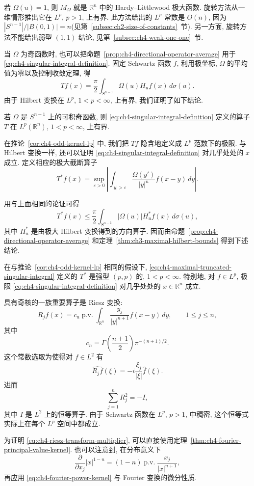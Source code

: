 若 $\Omega(u)=1$, 则 $M_\Omega$ 就是 $\mathbb R^n$ 中的 Hardy--Littlewood 极大函数. 旋转方法从一维情形推出它在 $L^p$, $p>1$, 上有界. 此方法给出的 $L^p$ 常数是 $O(n)$, 因为 $|S^{n-1}|/|B(0,1)|=n$(见第~\ref{subsec:ch2-size-of-constants}~节). 另一方面, 旋转方法不能给出弱型 $(1,1)$ 结论, 见第~\ref{subsec:ch4-weak-one-one}~节.

当 $\Omega$ 为奇函数时, 也可以把命题~\ref{prop:ch4-directional-operator-average} 用于 \eqref{eq:ch4-singular-integral-definition}. 固定 Schwartz 函数 $f$, 利用极坐标, $\Omega$ 的平均值为零以及控制收敛定理, 得
\[
 Tf(x)=\frac\pi2\int_{S^{n-1}}\Omega(u)H_uf(x)\,d\sigma(u).
\]
由于 Hilbert 变换在 $L^p$, $1<p<\infty$, 上有界, 我们证明了如下结论.

\begin{Corollary}
\label{cor:ch4-odd-kernel-lp}
若 $\Omega$ 是 $S^{n-1}$ 上的可积奇函数, 则 \eqref{eq:ch4-singular-integral-definition} 定义的算子 $T$ 在 $L^p(\mathbb R^n)$, $1<p<\infty$, 上有界.
\end{Corollary}

在推论~\ref{cor:ch4-odd-kernel-lp} 中, 我们把 $Tf$ 隐含地定义成 $L^p$ 范数下的极限. 与 Hilbert 变换一样, 还可以证明 \eqref{eq:ch4-singular-integral-definition} 对几乎处处的 $x$ 成立. 定义相应的极大截断算子
\begin{equation}
\label{eq:ch4-maximal-truncated-singular-integral}
 T^*f(x)=\sup_{\varepsilon>0}\left|
 \int_{|y|>\varepsilon}\frac{\Omega(y')}{|y|^n}f(x-y)\,dy\right|.
\end{equation}

\hypertarget{chapter-04-page-088}{}
用与上面相同的论证可得
\[
 T^*f(x)\le\frac\pi2\int_{S^{n-1}}|\Omega(u)|H_u^*f(x)\,d\sigma(u),
\]
其中 $H_u^*$ 是由极大 Hilbert 变换得到的方向算子. 因而由命题~\ref{prop:ch4-directional-operator-average} 和定理~\ref{thm:ch3-maximal-hilbert-bounds} 得到下述结论.

\begin{Corollary}
\label{cor:ch4-maximal-truncation-lp}
在与推论~\ref{cor:ch4-odd-kernel-lp} 相同的假设下, \eqref{eq:ch4-maximal-truncated-singular-integral} 定义的 $T^*$ 是强型 $(p,p)$ 的, $1<p<\infty$. 特别地, 对 $f\in L^p$, 极限 \eqref{eq:ch4-singular-integral-definition} 对几乎处处的 $x\in\mathbb R^n$ 成立.
\end{Corollary}

具有奇核的一族重要算子是 Riesz 变换:
\begin{equation}
\label{eq:ch4-riesz-transform-definition}
 R_jf(x)=c_n\operatorname{p.v.}\int_{\mathbb R^n}
 \frac{y_j}{|y|^{n+1}}f(x-y)\,dy,
 \qquad 1\le j\le n,
\end{equation}
其中
\[
 c_n=\Gamma\left(\frac{n+1}{2}\right)\pi^{-(n+1)/2}.
\]
这个常数选取为使得对 $f\in L^2$ 有
\begin{equation}
\label{eq:ch4-riesz-transform-multiplier}
 \widehat{R_jf}(\xi)=-i\frac{\xi_j}{|\xi|}\widehat f(\xi).
\end{equation}
进而
\begin{equation}
\label{eq:ch4-riesz-square-identity}
 \sum_{j=1}^nR_j^2=-I,
\end{equation}
其中 $I$ 是 $L^2$ 上的恒等算子. 由于 Schwartz 函数在 $L^p$, $p>1$, 中稠密, 这个恒等式实际上在每个 $L^p$ 空间中都成立.

为证明 \eqref{eq:ch4-riesz-transform-multiplier}, 可以直接使用定理~\ref{thm:ch4-fourier-principal-value-kernel}. 也可以注意到, 在分布意义下
\[
 \frac{\partial}{\partial x_j}|x|^{1-n}
 =(1-n)\operatorname{p.v.}\frac{x_j}{|x|^{n+1}},
\]
再应用 \eqref{eq:ch4-fourier-power-kernel} 与 Fourier 变换的微分性质.
